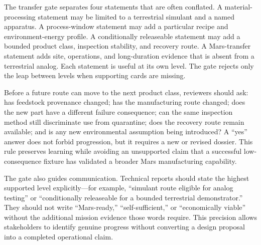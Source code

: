 \documentclass[conference]{../../../../Conference-LaTeX-template_10-17-19/IEEEtran}
\begin{document}
The transfer gate separates four statements that are often conflated. A material-processing statement may be limited to a terrestrial simulant and a named apparatus. A process-window statement may add a particular recipe and environment-energy profile. A conditionally releaseable statement may add a bounded product class, inspection stability, and recovery route. A Mars-transfer statement adds site, operations, and long-duration evidence that is absent from a terrestrial analog. Each statement is useful at its own level. The gate rejects only the leap between levels when supporting cards are missing.

Before a future route can move to the next product class, reviewers should ask: has feedstock provenance changed; has the manufacturing route changed; does the new part have a different failure consequence; can the same inspection method still discriminate use from quarantine; does the recovery route remain available; and is any new environmental assumption being introduced? A ``yes'' answer does not forbid progression, but it requires a new or revised dossier. This rule preserves learning while avoiding an unsupported claim that a successful low-consequence fixture has validated a broader Mars manufacturing capability.

The gate also guides communication. Technical reports should state the highest supported level explicitly---for example, ``simulant route eligible for analog testing'' or ``conditionally releaseable for a bounded terrestrial demonstrator.'' They should not write ``Mars-ready,'' ``self-sufficient,'' or ``economically viable'' without the additional mission evidence those words require. This precision allows stakeholders to identify genuine progress without converting a design proposal into a completed operational claim.
\end{document}
